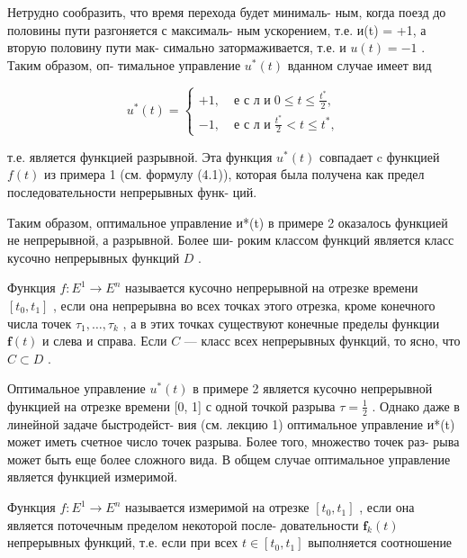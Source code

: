 \documentclass[8pt]{extarticle}
\begin{document}
Нетрудно сообразить, что время перехода будет минималь- ным, когда поезд до половины пути разгоняется с максималь- ным ускорением, т.е. и(t) = +1, а вторую половину пути мак- симально затормаживается, т.е. и \(u\left( t\right)  =  - 1\) . Таким образом, оп- тимальное управление \({u}^{ * }\left( t\right)\) вданном случае имеет вид

\[
{u}^{ * }\left( t\right)  = \left\{  \begin{array}{ll}  + 1, & \operatorname{\text{ е }\text{ с }\text{ л }\text{ и }}0 \leq  t \leq  \frac{{t}^{ * }}{2}, \\   - 1, & \operatorname{\text{ е }\text{ с }\text{ л }\text{ и }}\frac{{t}^{ * }}{2} < t \leq  {t}^{ * }, \end{array}\right.
\]

т.е. является функцией разрывной. Эта функция \({u}^{ * }\left( t\right)\) совпадает c функцией \(f\left( t\right)\) из примера 1 (см. формулу (4.1)), которая была получена как предел последовательности непрерывных функ- ций.

Таким образом, оптимальное управление и*(t) в примере 2 оказалось функцией не непрерывной, а разрывной. Более ши- роким классом функций является класс кусочно непрерывных функций \(D\) .

Функция \(f : {E}^{1} \rightarrow  {E}^{n}\) называется кусочно непрерывной на отрезке времени \(\left\lbrack  {{t}_{0},{t}_{1}}\right\rbrack\) , если она непрерывна во всех точках этого отрезка, кроме конечного числа точек \({\tau }_{1},\ldots ,{\tau }_{k}\) , а в этих точках существуют конечные пределы функции \(\mathbf{f}\left( t\right)\) и слева и справа. Если \(C\) — класс всех непрерывных функций, то ясно, что \(C \subset  D\) .

Оптимальное управление \({u}^{ * }\left( t\right)\) в примере 2 является кусочно непрерывной функцией на отрезке времени [0, 1] с одной точкой разрыва \(\tau  = \frac{1}{2}\) . Однако даже в линейной задаче быстродейст- вия (см. лекцию 1) оптимальное управление и*(t) может иметь счетное число точек разрыва. Более того, множество точек раз- рыва может быть еще более сложного вида. В общем случае оптимальное управление является функцией измеримой.

Функция \(f : {E}^{1} \rightarrow  {E}^{n}\) называется измеримой на отрезке \(\left\lbrack  {{t}_{0},{t}_{1}}\right\rbrack\) , если она является поточечным пределом некоторой после- довательности \({\mathbf{f}}_{k}\left( t\right)\) непрерывных функций, т.е. если при всех \(t \in  \left\lbrack  {{t}_{0},{t}_{1}}\right\rbrack\) выполняется соотношение
\end{document}
